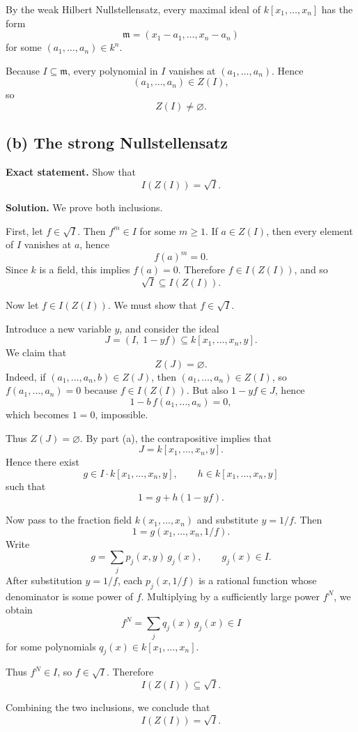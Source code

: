 \documentclass[12pt,a4paper,oneside]{report}
\theoremstyle{notespace}
\begin{document}
By the weak Hilbert Nullstellensatz, every maximal ideal of \(k[x_1,\dots,x_n]\) has the form
\[
\mathfrak m=(x_1-a_1,\dots,x_n-a_n)
\]
for some \((a_1,\dots,a_n)\in k^n\).

Because \(I\subseteq \mathfrak m\), every polynomial in \(I\) vanishes at \((a_1,\dots,a_n)\). Hence
\[
(a_1,\dots,a_n)\in Z(I),
\]
so
\[
Z(I)\neq\varnothing.
\]

\subsection*{(b) The strong Nullstellensatz}

\textbf{Exact statement.}
Show that
\[
I(Z(I))=\sqrt I.
\]

\textbf{Solution.}
We prove both inclusions.

First, let \(f\in \sqrt I\). Then \(f^m\in I\) for some \(m\ge 1\). If \(a\in Z(I)\), then every element of \(I\) vanishes at \(a\), hence
\[
f(a)^m=0.
\]
Since \(k\) is a field, this implies \(f(a)=0\). Therefore \(f\in I(Z(I))\), and so
\[
\sqrt I\subseteq I(Z(I)).
\]

Now let \(f\in I(Z(I))\). We must show that \(f\in \sqrt I\).

Introduce a new variable \(y\), and consider the ideal
\[
J=(I,\;1-yf)\subseteq k[x_1,\dots,x_n,y].
\]
We claim that
\[
Z(J)=\varnothing.
\]
Indeed, if \((a_1,\dots,a_n,b)\in Z(J)\), then \((a_1,\dots,a_n)\in Z(I)\), so \(f(a_1,\dots,a_n)=0\) because \(f\in I(Z(I))\). But also \(1-yf\in J\), hence
\[
1-b\,f(a_1,\dots,a_n)=0,
\]
which becomes \(1=0\), impossible.

Thus \(Z(J)=\varnothing\). By part (a), the contrapositive implies that
\[
J=k[x_1,\dots,x_n,y].
\]
Hence there exist
\[
g\in I\cdot k[x_1,\dots,x_n,y],\qquad h\in k[x_1,\dots,x_n,y]
\]
such that
\[
1=g+h(1-yf).
\]

Now pass to the fraction field \(k(x_1,\dots,x_n)\) and substitute \(y=1/f\). Then
\[
1=g(x_1,\dots,x_n,1/f).
\]
Write
\[
g=\sum_j p_j(x,y)\,g_j(x),
\qquad g_j(x)\in I.
\]
After substitution \(y=1/f\), each \(p_j(x,1/f)\) is a rational function whose denominator is some power of \(f\). Multiplying by a sufficiently large power \(f^N\), we obtain
\[
f^N=\sum_j q_j(x)\,g_j(x)\in I
\]
for some polynomials \(q_j(x)\in k[x_1,\dots,x_n]\).

Thus \(f^N\in I\), so \(f\in \sqrt I\). Therefore
\[
I(Z(I))\subseteq \sqrt I.
\]

Combining the two inclusions, we conclude that
\[
I(Z(I))=\sqrt I.
\]
\end{document}
